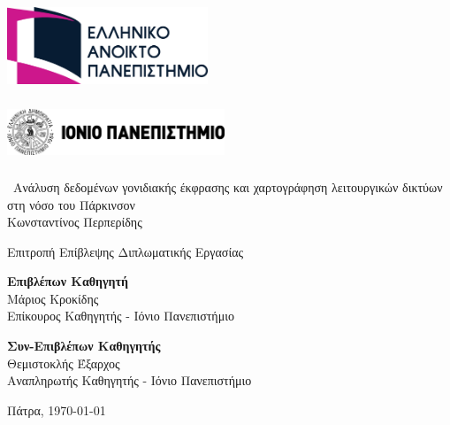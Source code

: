 \documentclass[12pt]{report}
\begin{document}
\clearpage
\thispagestyle{empty} %
\begin{center}
    
    \begin{minipage}[t]{0.45\textwidth}
        \centering
        \includegraphics[height=2.4cm,width=6cm]{university1-logo.png}\\
    \end{minipage}
    \hfill
    \begin{minipage}[t]{0.45\textwidth}
        \centering
        \includegraphics[height=1.8cm,width=6.5cm]{university2-logo.png}\\
    \end{minipage}
    \vspace*{2cm}
    
    \fontsize{18pt}{22pt}\selectfont\
        Ανάλυση δεδομένων γονιδιακής έκφρασης και χαρτογράφηση λειτουργικών δικτύων στη νόσο του Πάρκινσον\\
    \vspace*{2.5cm}
    \large Κωνσταντίνος Περπερίδης\\
    \vspace*{2.5cm}
    \begin{center}
    \fontsize{12pt}{14pt}\selectfont
    Επιτροπή Επίβλεψης Διπλωματικής Εργασίας\\[16pt]
    \begin{minipage}[t]{0.45\textwidth}
        \centering
        \fontsize{12pt}{14pt}\selectfont
        \textbf{Επιβλέπων Καθηγητή}\\
        Μάριος Κροκίδης\\
        Επίκουρος Καθηγητής - Ιόνιο Πανεπιστήμιο
    \end{minipage}
    \hfill %
    \begin{minipage}[t]{0.45\textwidth}
        \centering
        \fontsize{12pt}{14pt}\selectfont
        \textbf{Συν-Επιβλέπων Καθηγητής}\\
        Θεμιστοκλής Έξαρχος\\
        Αναπληρωτής Καθηγητής - Ιόνιο Πανεπιστήμιο
    \end{minipage}
    \end{center}
    \vspace*{2.5cm}
    \fontsize{14pt}{16pt}\selectfont
    Πάτρα, {\large \today}
    
    \vfill
\end{center}
\clearpage
\end{document}
